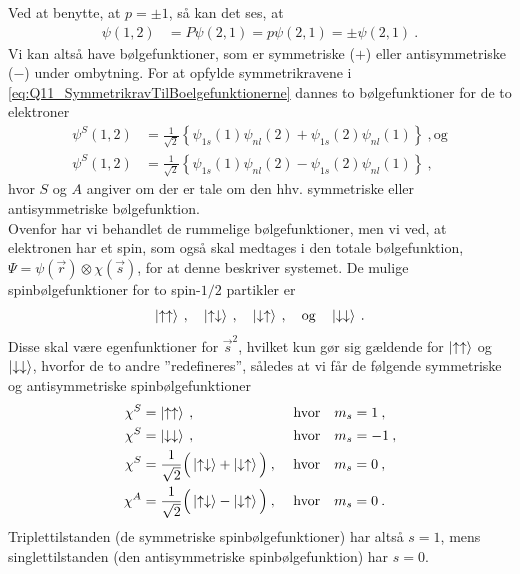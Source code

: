 Ved at benytte, at $p = \pm 1$, så kan det ses, at
\begin{align} \label{eq:Q11_SymmetrikravTilBoelgefunktionerne}
    \psi(1,2) &= P\psi(2,1) = p\psi(2,1) = \pm \psi(2,1) \: .
\end{align}
Vi kan altså have bølgefunktioner, som er symmetriske ($+$) eller antisymmetriske ($-$) under ombytning. For at opfylde symmetrikravene i \cref{eq:Q11_SymmetrikravTilBoelgefunktionerne} dannes to bølgefunktioner for de to elektroner
\begin{align}
    \psi^S(1,2) &= \frac{1}{\sqrt{2}} \left\{\psi_{1s}(1)\psi_{nl}(2) + \psi_{1s}(2)\psi_{nl}(1)\right\} \: , \text{og} \\
    \psi^S(1,2) &= \frac{1}{\sqrt{2}} \left\{\psi_{1s}(1)\psi_{nl}(2) - \psi_{1s}(2)\psi_{nl}(1)\right\} \: ,
\end{align}
hvor $S$ og $A$ angiver om der er tale om den hhv. symmetriske eller antisymmetriske bølgefunktion.\\

Ovenfor har vi behandlet de rummelige bølgefunktioner, men vi ved, at elektronen har et spin, som også skal medtages i den totale bølgefunktion, $\Psi = \psi(\Vec{r}) \otimes \chi(\Vec{s})$, for at denne beskriver systemet. De mulige spinbølgefunktioner for to spin-$1/2$ partikler er
\begin{align}
    \ket{\uparrow\uparrow} \: , \quad \ket{\uparrow\downarrow} \: , \quad \ket{\downarrow\uparrow} \: , \quad \text{og} \quad \ket{\downarrow\downarrow} \: .
\end{align}
Disse skal være egenfunktioner for $\Vec{s}^2$, hvilket kun gør sig gældende for $\ket{\uparrow\uparrow}$ og $\ket{\downarrow\downarrow}$, hvorfor de to andre ''redefineres'', således at vi får de følgende symmetriske og antisymmetriske spinbølgefunktioner
\begin{align}
    \chi^S &= \ket{\uparrow\uparrow} \: , \qquad \qquad \qquad \quad \text{hvor} \quad m_s = 1 \: , \\
    \chi^S &= \ket{\downarrow\downarrow} \: , \qquad \qquad \qquad \quad \text{hvor} \quad m_s = -1 \: , \\
    \chi^S &= \frac{1}{\sqrt{2}} \Big(\ket{\uparrow\downarrow} + \ket{\downarrow\uparrow}\Big) \: , \,\quad \text{hvor} \quad m_s = 0 \: , \\
    \chi^A &= \frac{1}{\sqrt{2}} \Big(\ket{\uparrow\downarrow} - \ket{\downarrow\uparrow}\Big) \: , \,\quad \text{hvor} \quad m_s = 0 \: .
\end{align}
Triplettilstanden (de symmetriske spinbølgefunktioner) har altså $s = 1$, mens singlettilstanden (den antisymmetriske spinbølgefunktion) har $s = 0$.


